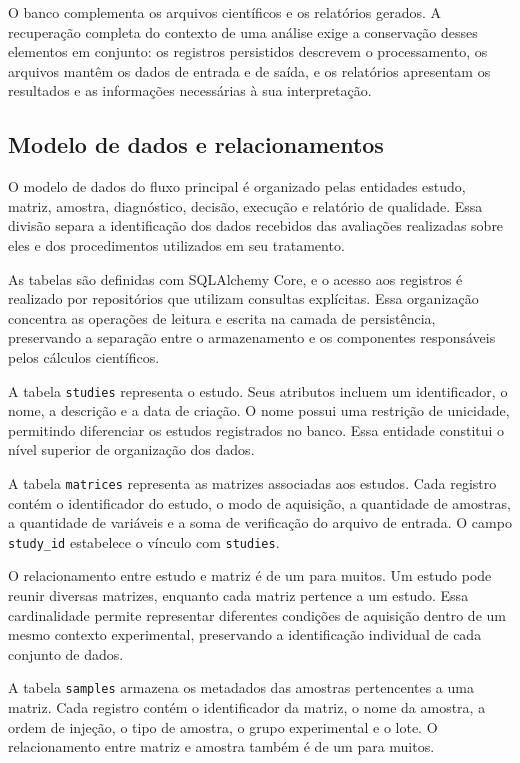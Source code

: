 O banco complementa os arquivos científicos e os relatórios gerados. A recuperação completa do contexto de uma análise exige a conservação desses elementos em conjunto: os registros persistidos descrevem o processamento, os arquivos mantêm os dados de entrada e de saída, e os relatórios apresentam os resultados e as informações necessárias à sua interpretação.

\subsection{Modelo de dados e relacionamentos}
\label{subsec:modelo-dados-relacionamentos}

O modelo de dados do fluxo principal é organizado pelas entidades estudo, matriz, amostra, diagnóstico, decisão, execução e relatório de qualidade. Essa divisão separa a identificação dos dados recebidos das avaliações realizadas sobre eles e dos procedimentos utilizados em seu tratamento.

As tabelas são definidas com SQLAlchemy Core, e o acesso aos registros é realizado por repositórios que utilizam consultas explícitas. Essa organização concentra as operações de leitura e escrita na camada de persistência, preservando a separação entre o armazenamento e os componentes responsáveis pelos cálculos científicos.

A tabela \texttt{studies} representa o estudo. Seus atributos incluem um identificador, o nome, a descrição e a data de criação. O nome possui uma restrição de unicidade, permitindo diferenciar os estudos registrados no banco. Essa entidade constitui o nível superior de organização dos dados.

A tabela \texttt{matrices} representa as matrizes associadas aos estudos. Cada registro contém o identificador do estudo, o modo de aquisição, a quantidade de amostras, a quantidade de variáveis e a soma de verificação do arquivo de entrada. O campo \texttt{study\_id} estabelece o vínculo com \texttt{studies}.

O relacionamento entre estudo e matriz é de um para muitos. Um estudo pode reunir diversas matrizes, enquanto cada matriz pertence a um estudo. Essa cardinalidade permite representar diferentes condições de aquisição dentro de um mesmo contexto experimental, preservando a identificação individual de cada conjunto de dados.

A tabela \texttt{samples} armazena os metadados das amostras pertencentes a uma matriz. Cada registro contém o identificador da matriz, o nome da amostra, a ordem de injeção, o tipo de amostra, o grupo experimental e o lote. O relacionamento entre matriz e amostra também é de um para muitos.

